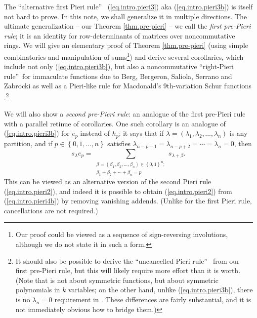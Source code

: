 \documentclass
[numbers=enddot,12pt,final,onecolumn,notitlepage,english]{scrartcl}%
\theoremstyle{definition}
\let\sumnonlimits\sum
\renewcommand{\sum}{\sumnonlimits\limits}
\begin{document}
The \textquotedblleft alternative first Pieri rule\textquotedblright%
\ (\ref{eq.intro.pieri3}) aka (\ref{eq.intro.pieri3b}) is itself not hard to
prove. In this note, we shall generalize it in multiple directions. The
ultimate generalization -- our Theorem \ref{thm.pre-pieri} -- we call the
\emph{first pre-Pieri rule}; it is an identity for row-determinants of
matrices over noncommutative rings. We will give an elementary proof of
Theorem \ref{thm.pre-pieri} (using simple combinatorics and manipulation of
sums\footnote{Our proof could be viewed as a sequence of sign-reversing
involutions, although we do not state it in such a form.}) and derive several
corollaries, which include not only (\ref{eq.intro.pieri3b}), but also a
noncommutative \textquotedblleft right-Pieri rule\textquotedblright\ for
immaculate functions due to Berg, Bergeron, Saliola, Serrano and Zabrocki
\cite[Theorem 3.5]{BBSSZ13} as well as a Pieri-like rule for Macdonald's
9th-variation Schur functions \cite[Proposition 3.9]{Fun}.\footnote{It should
also be possible to derive the \textquotedblleft uncancelled Pieri
rule\textquotedblright\ \cite[Theorem 11.7]{basisquot} from our first
pre-Pieri rule, but this will likely require more effort than it is worth.
(Note that \cite[Theorem 11.7]{basisquot} is not about symmetric functions,
but about symmetric polynomials in $k$ variables; on the other hand, unlike
(\ref{eq.intro.pieri3b}), there is no $\lambda_{n}=0$ requirement in
\cite[Theorem 11.7]{basisquot}. These differences are fairly substantial, and
it is not immediately obvious how to bridge them.)}

We will also show a \emph{second pre-Pieri rule}: an analogue of the first
pre-Pieri rule with a parallel retinue of corollaries. One such corollary is
an analogue of (\ref{eq.intro.pieri3b}) for $e_{p}$ instead of $h_{p}$; it
says that if $\lambda=\left(  \lambda_{1},\lambda_{2},\ldots,\lambda
_{n}\right)  $ is any partition, and if $p\in\left\{  0,1,\ldots,n\right\}  $
satisfies $\lambda_{n-p+1}=\lambda_{n-p+2}=\cdots=\lambda_{n}=0$, then%
\begin{equation}
s_{\lambda}e_{p}=\sum_{\substack{\beta=\left(  \beta_{1},\beta_{2}%
,\ldots,\beta_{n}\right)  \in\left\{  0,1\right\}  ^{n};\\\beta_{1}+\beta
_{2}+\cdots+\beta_{n}=p}}s_{\lambda+\beta}. \label{eq.intro.pieri4b}%
\end{equation}
This can be viewed as an alternative version of the second Pieri rule
(\ref{eq.intro.pieri2}), and indeed it is possible to obtain
(\ref{eq.intro.pieri2}) from (\ref{eq.intro.pieri4b}) by removing vanishing
addends. (Unlike for the first Pieri rule, cancellations are not required.)
\end{document}
